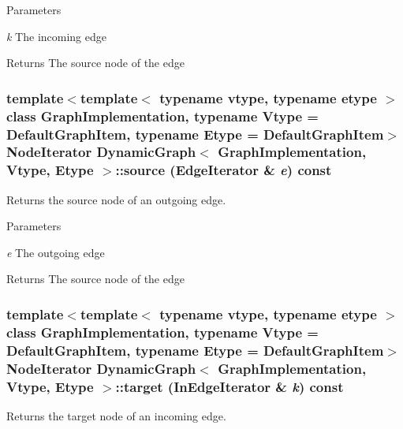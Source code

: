 \begin{DoxyParams}{Parameters}
\item[{\em k}]The incoming edge \end{DoxyParams}
\begin{DoxyReturn}{Returns}
The source node of the edge 
\end{DoxyReturn}
\hypertarget{class_dynamic_graph_a33514500857b840c200300df52bfc38c}{
\subsubsection[{source}]{\setlength{\rightskip}{0pt plus 5cm}template$<$template$<$ typename vtype, typename etype $>$ class GraphImplementation, typename Vtype  = DefaultGraphItem, typename Etype  = DefaultGraphItem$>$ NodeIterator {\bf DynamicGraph}$<$ GraphImplementation, Vtype, Etype $>$::source (EdgeIterator \& {\em e}) const}}
\label{class_dynamic_graph_a33514500857b840c200300df52bfc38c}


Returns the source node of an outgoing edge. 


\begin{DoxyParams}{Parameters}
\item[{\em e}]The outgoing edge \end{DoxyParams}
\begin{DoxyReturn}{Returns}
The source node of the edge 
\end{DoxyReturn}
\hypertarget{class_dynamic_graph_a0d6d44c1f95ee743e57164afd68954fc}{
\subsubsection[{target}]{\setlength{\rightskip}{0pt plus 5cm}template$<$template$<$ typename vtype, typename etype $>$ class GraphImplementation, typename Vtype  = DefaultGraphItem, typename Etype  = DefaultGraphItem$>$ NodeIterator {\bf DynamicGraph}$<$ GraphImplementation, Vtype, Etype $>$::target (InEdgeIterator \& {\em k}) const}}
\label{class_dynamic_graph_a0d6d44c1f95ee743e57164afd68954fc}


Returns the target node of an incoming edge. 


